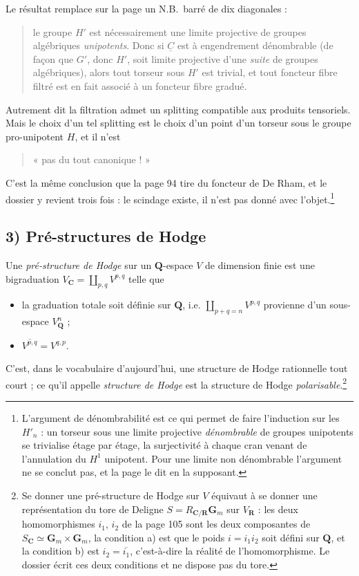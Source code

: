 \documentclass[11pt,a4paper]{article}
\begin{document}
Le résultat remplace sur la page un N.B.\ barré de dix
diagonales :
\begin{quote}
le groupe $H'$ est nécessairement une limite projective de groupes algébriques
\emph{unipotents}. Donc si $\underline{C}$ est à engendrement dénombrable
(de façon que $G'$, donc $H'$, soit limite projective d'une \emph{suite} de
groupes algébriques), alors tout torseur sous $H'$ est trivial, et tout
foncteur fibre filtré est en fait associé à un foncteur fibre gradué.
\end{quote}
Autrement dit la filtration admet un splitting compatible aux produits
tensoriels. Mais le choix d'un tel splitting est le choix d'un point d'un
torseur sous le groupe pro-unipotent $H$, et il n'est
\begin{quote}
« pas du tout canonique ! »
\end{quote}
C'est la même conclusion que la page 94 tire du foncteur de De Rham, et le
dossier y revient trois fois : le scindage existe, il n'est pas donné avec
l'objet.\footnote{L'argument de dénombrabilité est ce qui permet de
faire l'induction sur les $H'_{n}$ : un torseur sous une limite projective
\emph{dénombrable} de groupes unipotents se trivialise étage par étage, la
surjectivité à chaque cran venant de l'annulation du $H^{1}$ unipotent. Pour
une limite non dénombrable l'argument ne se conclut pas, et la page le dit en
la supposant.}

\subsection*{3) Pré-structures de Hodge}

Une \emph{pré-structure de Hodge} sur un $\mathbf{Q}$-espace $V$ de dimension
finie est une bigraduation $V_{\mathbf{C}} = \coprod_{p,q}V^{p,q}$ telle que
\begin{itemize}
\item[a)] la graduation totale soit définie sur $\mathbf{Q}$, i.e.
$\coprod_{p+q=n}V^{p,q}$ provienne d'un sous-espace $V^{n}_{\mathbf{Q}}$ ;
\item[b)] $\overline{V^{p,q}} = V^{q,p}$.
\end{itemize}
C'est, dans le vocabulaire d'aujourd'hui, une structure de Hodge rationnelle
tout court ; ce qu'il appelle \emph{structure de Hodge} est la structure de
Hodge \emph{polarisable}.\footnote{Se donner une pré-structure de Hodge sur $V$
équivaut à se donner une représentation du tore de Deligne $S =
R_{\mathbf{C}/\mathbf{R}}\mathbf{G}_{m}$ sur $V_{\mathbf{R}}$ : les deux
homomorphismes $i_{1}$, $i_{2}$ de la page 105 sont les deux composantes de
$S_{\mathbf{C}} \simeq \mathbf{G}_{m} \times \mathbf{G}_{m}$, la condition a)
est que le poids $i = i_{1}i_{2}$ soit défini sur $\mathbf{Q}$, et la condition
b) est $i_{2} = \overline{i_{1}}$, c'est-à-dire la réalité de l'homomorphisme.
Le dossier écrit ces deux conditions et ne dispose pas du tore.}
\end{document}
